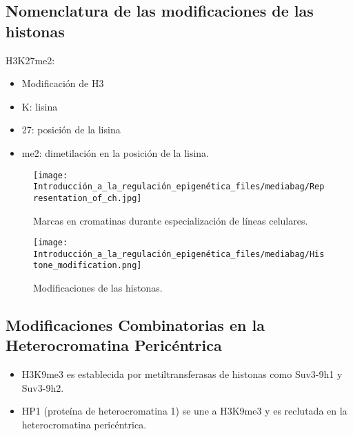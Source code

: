 \documentclass[
  letterpaper,
  DIV=11,
  numbers=noendperiod]{scrartcl}
\providecommand{\tightlist}{%
  \setlength{\itemsep}{0pt}\setlength{\parskip}{0pt}}\usepackage{longtable,booktabs,array}
\begin{document}
\subsection{Nomenclatura de las modificaciones de las
histonas}\label{nomenclatura-de-las-modificaciones-de-las-histonas}

H3K27me2:

\begin{itemize}
\item
  Modificación de H3
\item
  K: lisina
\item
  27: posición de la lisina
\item
  me2: dimetilación en la posición de la lisina.
\end{itemize}

\begin{figure}[H]

{\centering \texttt{[image: Introducción\_a\_la\_regulación\_epigenética\_files/mediabag/Representation\_of\_ch.jpg]}

}

\caption{Marcas en cromatinas durante especialización de líneas
celulares.}

\end{figure}%
\begin{figure}[H]

{\centering \texttt{[image: Introducción\_a\_la\_regulación\_epigenética\_files/mediabag/Histone\_modification.png]}

}

\caption{Modificaciones de las histonas.}

\end{figure}%

\subsection{Modificaciones Combinatorias en la Heterocromatina
Pericéntrica}\label{modificaciones-combinatorias-en-la-heterocromatina-pericuxe9ntrica}

\begin{itemize}
\tightlist
\item
  H3K9me3 es establecida por metiltransferasas de histonas como Suv3-9h1
  y Suv3-9h2.
\item
  HP1 (proteína de heterocromatina 1) se une a H3K9me3 y es reclutada en
  la heterocromatina pericéntrica.
\end{itemize}
\end{document}
